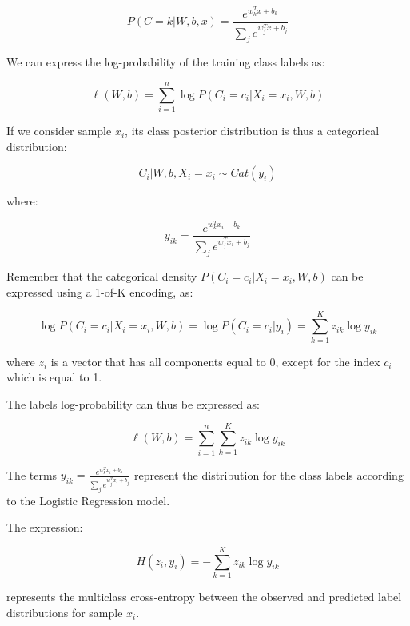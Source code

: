 \begin{equation*}
P(C = k | W, b, x) = \frac{e^{w_k^T x + b_k}}{\sum_j e^{w_j^T x + b_j}}
\end{equation*}

We can express the log-probability of the training class labels as:


\begin{equation*}
\ell(W, b) = \sum_{i=1}^n \log P(C_i = c_i | X_i = x_i, W, b)
\end{equation*}

If we consider sample $x_i$, its class posterior distribution is thus a categorical distribution:


\begin{equation*}
C_i | W, b, X_i = x_i \sim Cat(y_i)
\end{equation*}

where:


\begin{equation*}
y_{ik} = \frac{e^{w_k^T x_i + b_k}}{\sum_j e^{w_j^T x_i + b_j}}
\end{equation*}

Remember that the categorical density $P(C_i = c_i | X_i = x_i, W, b)$ can be expressed using a 1-of-K encoding, as:


\begin{equation*}
\log P(C_i = c_i | X_i = x_i, W, b) = \log P(C_i = c_i | y_i) = \sum_{k=1}^K z_{ik} \log y_{ik}
\end{equation*}

where $z_i$ is a vector that has all components equal to 0, except for the index $c_i$ which is equal to 1.

The labels log-probability can thus be expressed as:


\begin{equation*}
\ell(W, b) = \sum_{i=1}^n \sum_{k=1}^K z_{ik} \log y_{ik}
\end{equation*}

The terms $y_{ik} = \frac{e^{w_k^T x_i + b_k}}{\sum_j e^{w_j^T x_i + b_j}}$ represent the distribution for the class labels according to the Logistic Regression model.

The expression:


\begin{equation*}
H(z_i, y_i) = -\sum_{k=1}^K z_{ik} \log y_{ik}
\end{equation*}

represents the multiclass cross-entropy between the observed and predicted label distributions for sample $x_i$.


